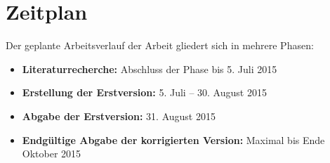\documentclass[a4paper, german, oneside]{scrartcl}
\begin{document}
\section{Zeitplan}

Der geplante Arbeitsverlauf der Arbeit gliedert sich in mehrere Phasen:

\begin{itemize}
	\item \textbf{Literaturrecherche:} Abschluss der Phase bis 5. Juli 2015
	\item \textbf{Erstellung der Erstversion:} 5. Juli -- 30. August 2015
	\item \textbf{Abgabe der Erstversion:} 31. August 2015
	\item \textbf{Endgültige Abgabe der korrigierten Version:} Maximal bis Ende Oktober 2015
\end{itemize}

\printbibliography[filter=LV]
\end{document}
